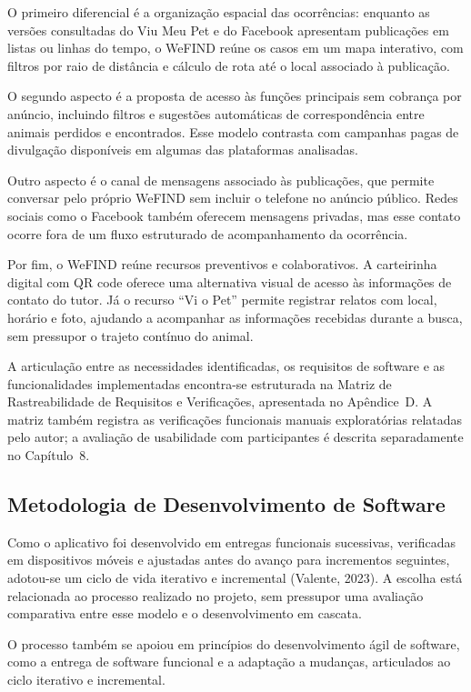 O primeiro diferencial é a organização espacial das ocorrências: enquanto as versões consultadas do Viu Meu Pet e do Facebook apresentam publicações em listas ou linhas do tempo, o WeFIND reúne os casos em um mapa interativo, com filtros por raio de distância e cálculo de rota até o local associado à publicação.

O segundo aspecto é a proposta de acesso às funções principais sem cobrança por anúncio, incluindo filtros e sugestões automáticas de correspondência entre animais perdidos e encontrados. Esse modelo contrasta com campanhas pagas de divulgação disponíveis em algumas das plataformas analisadas.

Outro aspecto é o canal de mensagens associado às publicações, que permite conversar pelo próprio WeFIND sem incluir o telefone no anúncio público. Redes sociais como o Facebook também oferecem mensagens privadas, mas esse contato ocorre fora de um fluxo estruturado de acompanhamento da ocorrência.

Por fim, o WeFIND reúne recursos preventivos e colaborativos. A carteirinha digital com QR code oferece uma alternativa visual de acesso às informações de contato do tutor. Já o recurso ``Vi o Pet'' permite registrar relatos com local, horário e foto, ajudando a acompanhar as informações recebidas durante a busca, sem pressupor o trajeto contínuo do animal.

A articulação entre as necessidades identificadas, os requisitos de software e as funcionalidades implementadas encontra-se estruturada na Matriz de Rastreabilidade de Requisitos e Verificações, apresentada no Apêndice~D. A matriz também registra as verificações funcionais manuais exploratórias relatadas pelo autor; a avaliação de usabilidade com participantes é descrita separadamente no Capítulo~8.

\subsection{Metodologia de Desenvolvimento de Software}

Como o aplicativo foi desenvolvido em entregas funcionais sucessivas, verificadas em dispositivos móveis e ajustadas antes do avanço para incrementos seguintes, adotou-se um ciclo de vida iterativo e incremental (Valente, 2023). A escolha está relacionada ao processo realizado no projeto, sem pressupor uma avaliação comparativa entre esse modelo e o desenvolvimento em cascata.

O processo também se apoiou em princípios do desenvolvimento ágil de software, como a entrega de software funcional e a adaptação a mudanças, articulados ao ciclo iterativo e incremental.


